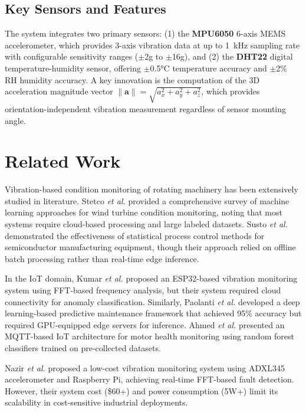 \documentclass[conference]{IEEEtran}
\begin{document}
\subsection{Key Sensors and Features}
The system integrates two primary sensors: (1) the \textbf{MPU6050} 6-axis MEMS accelerometer, which provides 3-axis vibration data at up to 1~kHz sampling rate with configurable sensitivity ranges ($\pm$2g to $\pm$16g), and (2) the \textbf{DHT22} digital temperature-humidity sensor, offering $\pm$0.5°C temperature accuracy and $\pm$2\% RH humidity accuracy. A key innovation is the computation of the 3D acceleration magnitude vector $\|\mathbf{a}\| = \sqrt{a_x^2 + a_y^2 + a_z^2}$, which provides orientation-independent vibration measurement regardless of sensor mounting angle.

\section{Related Work}

Vibration-based condition monitoring of rotating machinery has been extensively studied in literature. Stetco \textit{et al.} \cite{stetco2019} provided a comprehensive survey of machine learning approaches for wind turbine condition monitoring, noting that most systems require cloud-based processing and large labeled datasets. Susto \textit{et al.} \cite{susto2015} demonstrated the effectiveness of statistical process control methods for semiconductor manufacturing equipment, though their approach relied on offline batch processing rather than real-time edge inference.

In the IoT domain, Kumar \textit{et al.} \cite{kumar2020} proposed an ESP32-based vibration monitoring system using FFT-based frequency analysis, but their system required cloud connectivity for anomaly classification. Similarly, Paolanti \textit{et al.} \cite{paolanti2018} developed a deep learning-based predictive maintenance framework that achieved 95\% accuracy but required GPU-equipped edge servers for inference. Ahmed \textit{et al.} \cite{ahmed2021} presented an MQTT-based IoT architecture for motor health monitoring using random forest classifiers trained on pre-collected datasets.

Nazir \textit{et al.} \cite{nazir2023} proposed a low-cost vibration monitoring system using ADXL345 accelerometer and Raspberry Pi, achieving real-time FFT-based fault detection. However, their system cost (\$60+) and power consumption (5W+) limit its scalability in cost-sensitive industrial deployments.
\end{document}
